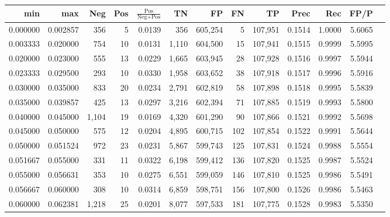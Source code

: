 \begin{tabular}{rrrrrrrrrrrrr}
\toprule
     min &      max &   Neg & Pos & $\frac{\text{Pos}}{\text{Neg}+\text{Pos}}$ &      TN &      FP &      FN &      TP &   Prec &    Rec &   FP/P \\
\midrule
0.000000 & 0.002857 &   356 &   5 &                                     0.0139 &     356 & 605,254 &       5 & 107,951 & 0.1514 & 1.0000 & 5.6065 \\
0.003333 & 0.020000 &   754 &  10 &                                     0.0131 &   1,110 & 604,500 &      15 & 107,941 & 0.1515 & 0.9999 & 5.5995 \\
0.020000 & 0.023000 &   555 &  13 &                                     0.0229 &   1,665 & 603,945 &      28 & 107,928 & 0.1516 & 0.9997 & 5.5944 \\
0.023333 & 0.029500 &   293 &  10 &                                     0.0330 &   1,958 & 603,652 &      38 & 107,918 & 0.1517 & 0.9996 & 5.5916 \\
0.030000 & 0.035000 &   833 &  20 &                                     0.0234 &   2,791 & 602,819 &      58 & 107,898 & 0.1518 & 0.9995 & 5.5839 \\
0.035000 & 0.039857 &   425 &  13 &                                     0.0297 &   3,216 & 602,394 &      71 & 107,885 & 0.1519 & 0.9993 & 5.5800 \\
0.040000 & 0.045000 & 1,104 &  19 &                                     0.0169 &   4,320 & 601,290 &      90 & 107,866 & 0.1521 & 0.9992 & 5.5698 \\
0.045000 & 0.050000 &   575 &  12 &                                     0.0204 &   4,895 & 600,715 &     102 & 107,854 & 0.1522 & 0.9991 & 5.5644 \\
0.050000 & 0.051524 &   972 &  23 &                                     0.0231 &   5,867 & 599,743 &     125 & 107,831 & 0.1524 & 0.9988 & 5.5554 \\
0.051667 & 0.055000 &   331 &  11 &                                     0.0322 &   6,198 & 599,412 &     136 & 107,820 & 0.1525 & 0.9987 & 5.5524 \\
0.055000 & 0.056631 &   353 &  10 &                                     0.0275 &   6,551 & 599,059 &     146 & 107,810 & 0.1525 & 0.9986 & 5.5491 \\
0.056667 & 0.060000 &   308 &  10 &                                     0.0314 &   6,859 & 598,751 &     156 & 107,800 & 0.1526 & 0.9986 & 5.5463 \\
0.060000 & 0.062381 & 1,218 &  25 &                                     0.0201 &   8,077 & 597,533 &     181 & 107,775 & 0.1528 & 0.9983 & 5.5350 \\

\end{tabular}
